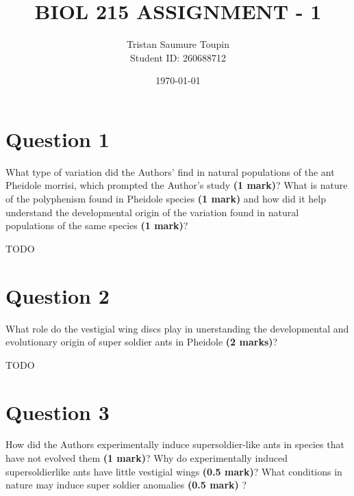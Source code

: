 \documentclass[letterpaper,12pt]{article}
\newenvironment{myindentpar}[1]%
{\begin{list}{}%
          {\setlength{\leftmargin}{#1}}%
          \item[]%
}
{\end{list}}
\begin{document}
\title{BIOL 215 ASSIGNMENT - 1}
\author{Tristan Saumure Toupin \\ Student ID: 260688712}
\date{\today}
\maketitle


\section{Question 1}

What type of variation did the Authors’ find in natural populations of the ant Pheidole morrisi, which prompted the Author’s study \textbf{(1 mark)}? What is nature of the polyphenism found in Pheidole species \textbf{(1 mark)} and how did it help understand the developmental origin of the variation found in natural populations of the same species \textbf{(1 mark)}?
\vspace*{20px}

\begin{myindentpar}{0.5cm}
TODO
\end{myindentpar}



\section{Question 2}

What role do the vestigial wing discs play in unerstanding the developmental and evolutionary origin of super soldier ants in Pheidole \textbf{(2 marks)}?
\vspace*{20px}

\begin{myindentpar}{0.5cm}
TODO
\end{myindentpar}



\section{Question 3}

How did the Authors experimentally induce supersoldier-like ants in species that have not evolved them \textbf{(1 mark)}? Why do experimentally induced supersoldierlike ants have little vestigial wings \textbf{(0.5 mark)}? What conditions in nature may induce super soldier anomalies \textbf{(0.5 mark)} ?
\vspace*{20px}
\end{document}
